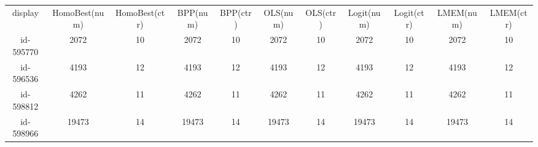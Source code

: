 \begin{tabular}{ccccccccccc}
display & HomoBest(num) & HomoBest(ctr) & BPP(num) & BPP(ctr) & OLS(num) & OLS(ctr) & Logit(num) & Logit(ctr) & LMEM(num) & LMEM(ctr)\\
id-595770 & 2072 & 10 & 2072 & 10 & 2072 & 10 & 2072 & 10 & 2072 & 10\\
id-596536 & 4193 & 12 & 4193 & 12 & 4193 & 12 & 4193 & 12 & 4193 & 12\\
id-598812 & 4262 & 11 & 4262 & 11 & 4262 & 11 & 4262 & 11 & 4262 & 11\\
id-598966 & 19473 & 14 & 19473 & 14 & 19473 & 14 & 19473 & 14 & 19473 & 14\\
\end{tabular}
